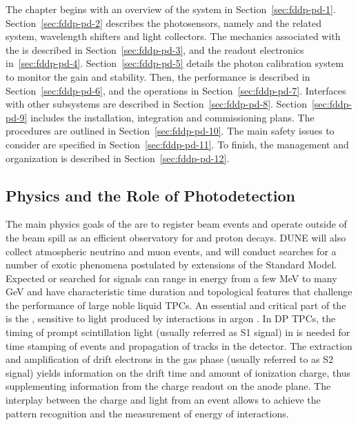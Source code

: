 The chapter begins with an overview of the system in Section~\ref{sec:fddp-pd-1}. Section~\ref{sec:fddp-pd-2} describes the photosensors, namely  %
and the related  system, wavelength shifters and light collectors. The mechanics associated with the  is described in Section~\ref{sec:fddp-pd-3}, and the readout electronics in~\ref{sec:fddp-pd-4}. Section~\ref{sec:fddp-pd-5} details the photon calibration system to monitor the  gain and stability. Then, the  performance is described in Section~\ref{sec:fddp-pd-6}, and the operations in Section~\ref{sec:fddp-pd-7}. Interfaces with other subsystems are described in Section~\ref{sec:fddp-pd-8}. Section~\ref{sec:fddp-pd-9} includes the installation, integration and commissioning plans. The  procedures are outlined in Section~\ref{sec:fddp-pd-10}. The main safety issues to consider are specified in Section~\ref{sec:fddp-pd-11}. To finish, the management and organization is described in Section~\ref{sec:fddp-pd-12}.

\subsection{Physics and the Role of Photodetection}
\label{sec:fddp-pd-1.2}

The main physics goals of the  are to register beam events %
and operate outside of the beam spill as an efficient observatory for  and proton decays. DUNE will also collect atmospheric neutrino and muon events, and will conduct searches for a number of exotic phenomena postulated by extensions of the Standard Model.  Expected or searched for signals can range in energy from a few \si{MeV} to many \si{GeV} and have characteristic time duration and topological features that challenge the performance of large noble liquid TPCs. An essential and critical part of the \lartpc is the , sensitive to light produced by interactions in argon \cite{Cuesta:2017nrs}. In DP TPCs, the timing of prompt scintillation light (usually referred as S1 signal) in \lar is needed for time stamping of events and propagation of tracks in the detector. The extraction and amplification of drift electrons in the gas phase (usually referred to as S2 signal) yields information on the drift time and amount of ionization charge, thus supplementing information from the charge readout on the anode plane. The interplay between the charge and light from an event allows to achieve the pattern recognition and the measurement of energy of interactions.


